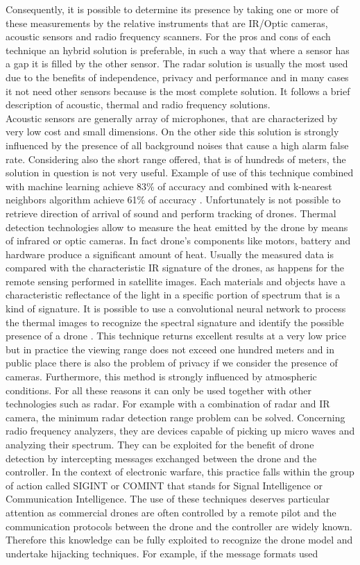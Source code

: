 Consequently, it is possible to determine its presence by taking one or more of these measurements by the relative instruments that are IR/Optic cameras, acoustic sensors and radio frequency scanners. For the pros and cons of each technique an hybrid solution is preferable, in such a way that where a sensor has a gap it is filled by the other sensor. The radar solution is usually the most used due to the benefits of independence, privacy and performance and in many cases it not need other sensors because is the most complete solution. It follows a brief description of acoustic, thermal and radio frequency solutions. \\ Acoustic sensors are generally array of microphones, that are characterized by very low cost and small dimensions. On the other side this solution is strongly influenced by the presence of all background noises that cause a high alarm false rate. Considering also the short range offered, that is of hundreds of meters, the solution in question is not very useful. Example of use of this technique combined with machine learning achieve 83\% of accuracy and combined with k-nearest neighbors algorithm achieve 61\% of accuracy \cite{survey} \cite{robinradar1}. Unfortunately is not possible to retrieve direction of arrival of sound and perform tracking of drones. Thermal detection technologies allow to measure the heat emitted by the drone by means of infrared or optic cameras. In fact drone's components like motors, battery and hardware produce a significant amount of heat. Usually the measured data is compared with the characteristic IR signature of the drones, as happens for the remote sensing performed in satellite images. Each materials and objects have a characteristic reflectance of the light in a specific portion of spectrum that is a kind of signature. It is possible to use a convolutional neural network to process the thermal images to recognize the spectral signature and identify the possible presence of a drone \cite{survey}. This technique returns excellent results at a very low price but in practice the viewing range does not exceed one hundred meters and in public place there is also the problem of privacy if we consider the presence of cameras. Furthermore, this method is strongly influenced by atmospheric conditions. For all these reasons it can only be used together with other technologies such as radar. For example with a combination of radar and IR camera, the minimum radar detection range problem can be solved. Concerning radio frequency analyzers, they are devices capable of picking up micro waves and analyzing their spectrum. They can be exploited for the benefit of drone detection by intercepting messages exchanged between the drone and the controller. In the context of electronic warfare, this practice falls within the group of action called SIGINT or COMINT that stands for Signal Intelligence or Communication Intelligence. The use of these techniques deserves particular attention as commercial drones are often controlled by a remote pilot and the communication protocols between the drone and the controller are widely known. Therefore this knowledge can be fully exploited to recognize the drone model and undertake hijacking techniques. For example, if the message formats used 